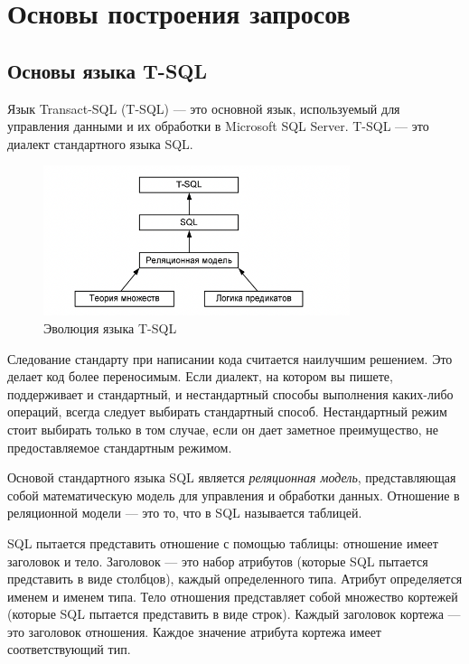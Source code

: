 \chapter{Основы построения запросов}
\section{Основы языка T-SQL}

Язык Transact-SQL (T-SQL) --- это основной язык, используемый для управления данными и их обработки в Microsoft SQL Server. T-SQL — это диалект стандартного языка SQL.

\begin{figure}[h!]
	\begin{center}
		\includegraphics[width=0.8\textwidth]{img/tsql.png}
	\end{center}
	\captionsetup{justification=centering}
	\caption{Эволюция языка T-SQL}
	\label{img:ev}
\end{figure}

Следование стандарту при написании кода считается наилучшим решением. Это
делает код более переносимым. Если диалект, на котором вы пишете, поддерживает и стандартный, и нестандартный способы выполнения каких-либо операций, всегда следует выбирать стандартный способ. Нестандартный режим стоит выбирать только в том случае, если он
дает заметное преимущество, не предоставляемое стандартным режимом. 

Основой стандартного языка SQL является \textit{реляционная модель}, представляющая собой математическую модель для управления и обработки данных. Отношение в реляционной модели — это то, что в SQL называется таблицей.

SQL пытается представить отношение с помощью
таблицы: отношение имеет заголовок и тело. Заголовок — это набор атрибутов (которые SQL пытается представить в виде столбцов), каждый определенного типа.
Атрибут определяется именем и именем типа. Тело отношения представляет собой
множество кортежей (которые SQL пытается представить в виде строк). Каждый
заголовок кортежа — это заголовок отношения. Каждое значение атрибута кортежа
имеет соответствующий тип.

